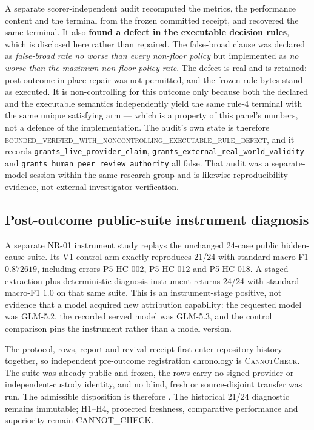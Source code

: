 A separate scorer-independent audit recomputed the metrics, the performance
content and the terminal from the frozen committed receipt, and recovered the
same terminal. It also \textbf{found a defect in the executable decision rules},
which is disclosed here rather than repaired. The false-broad clause was declared
as \emph{false-broad rate no worse than every non-floor policy} but implemented as
\emph{no worse than the maximum non-floor policy rate}. The defect is real and is
retained: post-outcome in-place repair was not permitted, and the frozen rule
bytes stand as executed. It is non-controlling for this outcome only because both
the declared and the executable semantics independently yield the same rule-4
terminal with the same unique satisfying arm --- which is a property of this
panel's numbers, not a defence of the implementation. The audit's own state is
therefore \textsc{bounded\_verified\_with\_noncontrolling\_executable\_rule\_defect},
and it records \texttt{grants\_live\_provider\_claim}, \texttt{grants\_external\_real\_world\_validity}
and \texttt{grants\_human\_peer\_review\_authority} all false. That audit was a
separate-model session within the same research group and is likewise
reproducibility evidence, not external-investigator verification.

\subsection*{Post-outcome public-suite instrument diagnosis}

A separate NR-01 instrument study replays the unchanged 24-case public
hidden-cause suite. Its V1-control arm exactly reproduces 21/24 with standard
macro-F1 $0.872619$, including errors P5-HC-002, P5-HC-012 and P5-HC-018. A
staged-extraction-plus-deterministic-diagnosis instrument returns 24/24 with
standard macro-F1 $1.0$ on that same suite. This is an instrument-stage
positive, not evidence that a model acquired new attribution capability: the
requested model was GLM-5.2, the recorded served model was GLM-5.3, and the
control comparison pins the instrument rather than a model version.

The protocol, rows, report and revival receipt first enter repository history
together, so independent pre-outcome registration chronology is
\textsc{CannotCheck}. The suite was already public and frozen, the rows carry
no signed provider or independent-custody identity, and no blind, fresh or
source-disjoint transfer was run. The admissible disposition is therefore
. The historical
21/24 diagnostic remains immutable; H1--H4, protected freshness, comparative
performance and superiority remain \textsf{CANNOT\_CHECK}.


